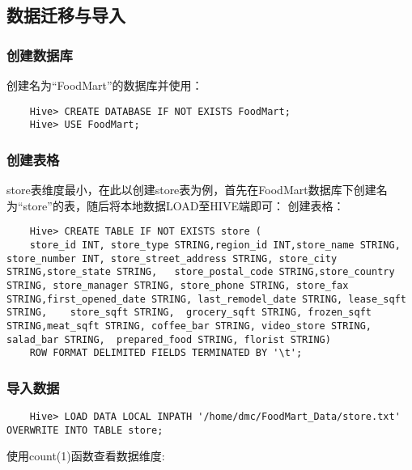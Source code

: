 \subsection{数据迁移与导入}\label{ux6570ux636eux8fc1ux79fbux4e0eux5bfcux5165}

\subsubsection{创建数据库}\label{ux521bux5efaux6570ux636eux5e93}

创建名为``FoodMart''的数据库并使用：

\begin{lstlisting}
	Hive> CREATE DATABASE IF NOT EXISTS FoodMart;
	Hive> USE FoodMart;
\end{lstlisting}

\subsubsection{创建表格}\label{ux521bux5efaux8868ux683c}

store表维度最小，在此以创建store表为例，首先在FoodMart数据库下创建名为``store''的表，随后将本地数据LOAD至HIVE端即可：
创建表格：

\begin{lstlisting}
	Hive> CREATE TABLE IF NOT EXISTS store (
	store_id INT, store_type STRING,region_id INT,store_name STRING, store_number INT, store_street_address STRING, store_city STRING,store_state STRING,   store_postal_code STRING,store_country STRING, store_manager STRING, store_phone STRING, store_fax STRING,first_opened_date STRING, last_remodel_date STRING, lease_sqft STRING,    store_sqft STRING,  grocery_sqft STRING, frozen_sqft STRING,meat_sqft STRING, coffee_bar STRING, video_store STRING, salad_bar STRING,  prepared_food STRING, florist STRING)
	ROW FORMAT DELIMITED FIELDS TERMINATED BY '\t';
\end{lstlisting}

\subsubsection{导入数据}\label{ux5bfcux5165ux6570ux636e}

\begin{lstlisting}
	Hive> LOAD DATA LOCAL INPATH '/home/dmc/FoodMart_Data/store.txt' OVERWRITE INTO TABLE store;
\end{lstlisting}

使用count(1)函数查看数据维度:

